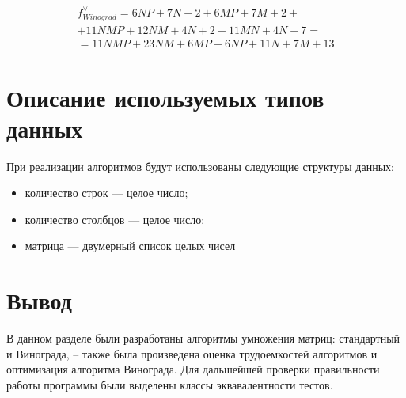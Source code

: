 \begin{multline}\label{winogradworse}
    f_{Winograd}^{\vee} = 6NP + 7N + 2 + 6MP + 7M + 2 + \\
                            + 11NMP + 12NM + 4N + 2 + 11MN + 4N + 7 = \\
                        = 11NMP + 23NM + 6MP + 6NP + 11N + 7M + 13
\end{multline}

\section{Описание используемых типов данных}

При реализации алгоритмов будут использованы следующие структуры данных:

\begin{itemize}
	\item количество строк --- целое число;
	\item количество столбцов --- целое число;
	\item матрица --- двумерный список целых чисел
\end{itemize}

\clearpage
\section{Вывод}

В данном разделе были разработаны алгоритмы умножения матриц: стандартный и Винограда, 
-- также была произведена оценка трудоемкостей алгоритмов и оптимизация алгоритма Винограда. 
Для дальшейшей проверки правильности работы программы были выделены классы эквавалентности тестов.

